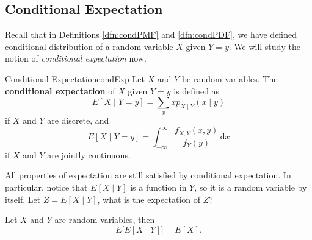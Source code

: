 \documentclass[math]{amznotes}
\theoremstyle{remark}
\begin{document}
\subsection{Conditional Expectation}
Recall that in Definitions \ref{dfn:condPMF} and \ref{dfn:condPDF}, we have defined conditional distribution of a random variable $X$ given $Y = y$. We will study the notion of \textit{conditional expectation} now.
\begin{dfnbox}{Conditional Expectation}{condExp}
    Let $X$ and $Y$ be random variables. The {\color{red} \textbf{conditional expectation}} of $X$ given $Y = y$ is defined as
    \begin{equation*}
        E\left[X \mid Y = y\right] = \sum_{x}xp_{X \mid Y}(x \mid y)
    \end{equation*}
    if $X$ and $Y$ are discrete, and
    \begin{equation*}
        E\left[X \mid Y = y\right] = \int_{-\infty}^{\infty}\!\frac{f_{X, Y}(x, y)}{f_Y(y)}\,\mathrm{d}x
    \end{equation*}
    if $X$ and $Y$ are jointly continuous.
\end{dfnbox}
All properties of expectation are still satisfied by conditional expectation. In particular, notice that $E\left[X \mid Y\right]$ is a function in $Y$, so it is a random variable by itself. Let $Z = E[X \mid Y]$, what is the expectation of $Z$?
\begin{probox}{}{}
    Let $X$ and $Y$ are random variables, then
    \begin{equation*}
        E\bigl[E[X \mid Y]\bigr] = E[X].
    \end{equation*}
\end{probox}
\end{document}
